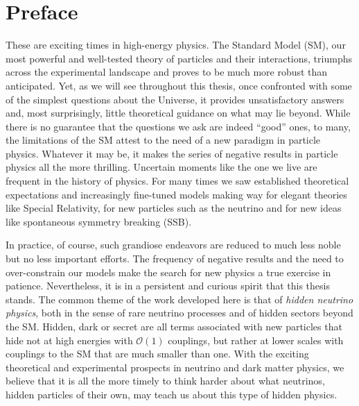 \documentclass[openany,twoside,frontopenright,chaprunninghead]{ip3thesis}
\begin{document}
\chapter*{Preface}

These are exciting times in high-energy physics. The Standard Model (SM), our most powerful and well-tested theory of particles and their interactions, triumphs across the experimental landscape and proves to be much more robust than anticipated. Yet, as we will see throughout this thesis, once confronted with some of the simplest questions about the Universe, it provides unsatisfactory answers and, most surprisingly, little theoretical guidance on what may lie beyond. While there is no guarantee that the questions we ask are indeed ``good'' ones, to many, the limitations of the SM attest to the need of a new paradigm in particle physics. Whatever it may be, it makes the series of negative results in particle physics all the more thrilling. Uncertain moments like the one we live are frequent in the history of physics. For many times we saw established theoretical expectations and increasingly fine-tuned models making way for elegant theories like Special Relativity, for new particles such as the neutrino and for new ideas like spontaneous symmetry breaking (SSB).

In practice, of course, such grandiose endeavors are reduced to much less noble but no less important efforts. The frequency of negative results and the need to over-constrain our models make the search for new physics a true exercise in patience. Nevertheless, it is in a persistent and curious spirit that this thesis stands. The common theme of the work developed here is that of \emph{hidden neutrino physics}, both in the sense of rare neutrino processes and of hidden sectors beyond the SM. Hidden, dark or secret are all terms associated with new particles that hide not at high energies with $\mathscr{O}(1)$ couplings, but rather at lower scales with couplings to the SM that are much smaller than one. With the exciting theoretical and experimental prospects in neutrino and dark matter physics, we believe that it is all the more timely to think harder about what neutrinos, hidden particles of their own, may teach us about this type of hidden physics. 
\end{document}
